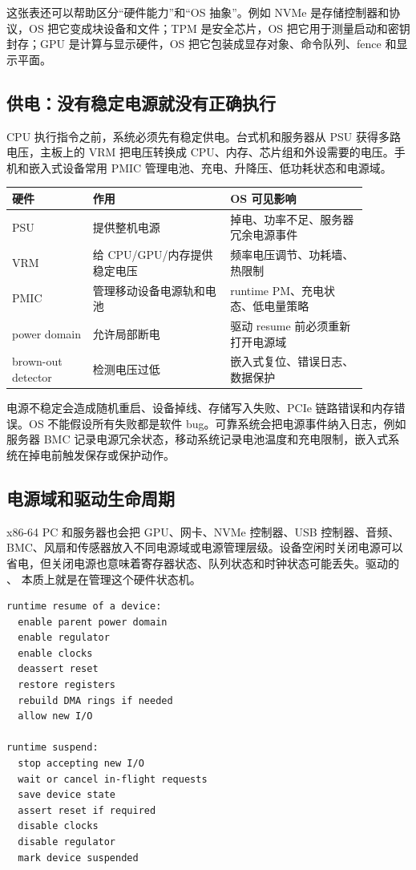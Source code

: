 这张表还可以帮助区分“硬件能力”和“OS 抽象”。例如 NVMe 是存储控制器和协议，OS 把它变成块设备和文件；TPM 是安全芯片，OS 把它用于测量启动和密钥封存；GPU 是计算与显示硬件，OS 把它包装成显存对象、命令队列、fence 和显示平面。

\subsection{供电：没有稳定电源就没有正确执行}

CPU 执行指令之前，系统必须先有稳定供电。台式机和服务器从 PSU 获得多路电压，主板上的 VRM 把电压转换成 CPU、内存、芯片组和外设需要的电压。手机和嵌入式设备常用 PMIC 管理电池、充电、升降压、低功耗状态和电源域。

\begin{longtable}{p{0.2\linewidth}p{0.34\linewidth}p{0.34\linewidth}}
\toprule
硬件 & 作用 & OS 可见影响 \\
\midrule
PSU & 提供整机电源 & 掉电、功率不足、服务器冗余电源事件 \\
VRM & 给 CPU/GPU/内存提供稳定电压 & 频率电压调节、功耗墙、热限制 \\
PMIC & 管理移动设备电源轨和电池 & runtime PM、充电状态、低电量策略 \\
power domain & 允许局部断电 & 驱动 resume 前必须重新打开电源域 \\
brown-out detector & 检测电压过低 & 嵌入式复位、错误日志、数据保护 \\
\bottomrule
\end{longtable}

电源不稳定会造成随机重启、设备掉线、存储写入失败、PCIe 链路错误和内存错误。OS 不能假设所有失败都是软件 bug。可靠系统会把电源事件纳入日志，例如服务器 BMC 记录电源冗余状态，移动系统记录电池温度和充电限制，嵌入式系统在掉电前触发保存或保护动作。

\subsection{电源域和驱动生命周期}

x86-64 PC 和服务器也会把 GPU、网卡、NVMe 控制器、USB 控制器、音频、BMC、风扇和传感器放入不同电源域或电源管理层级。设备空闲时关闭电源可以省电，但关闭电源也意味着寄存器状态、队列状态和时钟状态可能丢失。驱动的 、 本质上就是在管理这个硬件状态机。

\begin{lstlisting}
runtime resume of a device:
  enable parent power domain
  enable regulator
  enable clocks
  deassert reset
  restore registers
  rebuild DMA rings if needed
  allow new I/O

runtime suspend:
  stop accepting new I/O
  wait or cancel in-flight requests
  save device state
  assert reset if required
  disable clocks
  disable regulator
  mark device suspended
\end{lstlisting}

